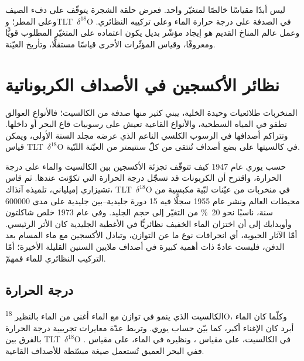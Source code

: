  ليس أبدًا مقياسًا خالصًا لمتغيّر واحد. فعرض حلقة الشجرة يتوقّف على دفء
الصيف وعلى المطر؛ و\mbox{\textdir TLT $\delta^{18}$O} في الصدفة على درجة حرارة الماء وعلى
تركيبه النظائري. وعمل عالم المناخ القديم هو إيجاد مؤشّر بديل يكون اعتماده
على المتغيّر المطلوب قويًّا ومعروفًا، وقياس المؤثّرات الأخرى قياسًا مستقلًّا،
وتأريخ العيّنة.

\section{نظائر الأكسجين في الأصداف الكربوناتية}\label{sec:b2:climate-proxies:oxygen}

المنخربات طلائعيات وحيدة الخلية، يبني كثير منها صدفة من الكالسيت؛ فالأنواع العوالق
تطفو في المياه السطحية، والأنواع القاعية تعيش على رسوبيات قاع البحر أو
داخلها. وتتراكم أصدافها في الرسوب الكلسي الناعم الذي عرضه مجلد السنة الأولى، ويمكن قياس
\mbox{\textdir TLT $\delta^{18}$O} في كالسيتها على بضع أصداف تُنتقى من كلّ سنتيمتر من
العيّنة اللبّية.

\begin{history}
حسب يوري عام 1947 كيف تتوقّف تجزئة الأكسجين بين الكالسيت والماء على
درجة الحرارة، واقترح أن الكربونات قد تسجّل درجة الحرارة التي تكوّنت عندها. ثم قاس تشيزاري
إميلياني، تلميذه آنذاك، \mbox{\textdir TLT $\delta^{18}$O} في منخربات من عيّنات لبّية مكبسية من
محيطات العالم ونشر عام 1955 سجلًّا فيه 15 دورة جليدية--بين جليدية على مدى
\num{600000} سنة، ناسبًا نحو \qty{20}{\percent} من التغيّر إلى حجم الجليد.
وفي عام 1973 خلص شاكلتون وأوبدايك إلى أن اختزان الماء الخفيف نظائريًّا في
الأغطية الجليدية كان الأثر الرئيسي. أمّا الآثار الحيوية، أي انحرافات نوع ما عن التوازن،
وتبادل الأكسجين مع ماء المسام بعد الدفن، فليست عادةً ذات أهمية كبيرة في
أصداف ملايين السنين القليلة الأخيرة؛ أمّا التركيب النظائري للماء فمهمّ.
\end{history}

\subsection*{درجة الحرارة}

الكالسيت الذي ينمو في توازن مع الماء أغنى من الماء بالنظير \textsuperscript{18}O،
وكلّما كان الماء أبرد كان الإغناء أكبر، كما بيّن حساب يوري. وتربط عدّة
معايرات تجريبية
درجة الحرارة بالفرق بين \mbox{\textdir TLT $\delta^{18}$O} في الكالسيت، على مقياس ،
ونظيره في الماء، على مقياس . ففي البحر العميق تُستعمل صيغة مبسّطة للأصداف
القاعية.


